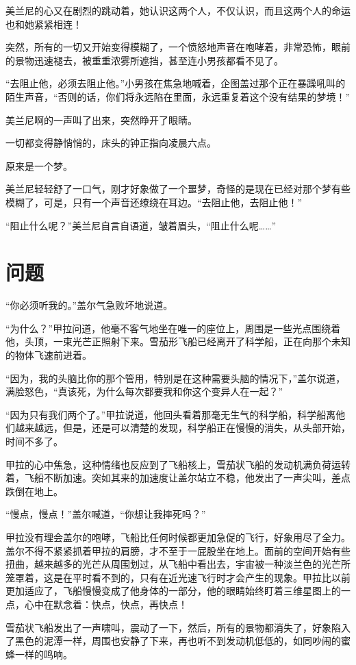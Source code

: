 美兰尼的心又在剧烈的跳动着，她认识这两个人，不仅认识，而且这两个人的命运也和她紧紧相连！ 

突然，所有的一切又开始变得模糊了，一个愤怒地声音在咆哮着，非常恐怖，眼前的景物迅速褪去，被重重浓雾所遮挡，甚至连小男孩都看不见了。 

“去阻止他，必须去阻止他。”小男孩在焦急地喊着，企图盖过那个正在暴躁吼叫的陌生声音，“否则的话，你们将永远陷在里面，永远重复着这个没有结果的梦境！” 

美兰尼啊的一声叫了出来，突然睁开了眼睛。 

一切都变得静悄悄的，床头的钟正指向凌晨六点。 

原来是一个梦。 

美兰尼轻轻舒了一口气，刚才好象做了一个噩梦，奇怪的是现在已经对那个梦有些模糊了，可是，只有一个声音还缭绕在耳边。“去阻止他，去阻止他！” 

“阻止什么呢？”美兰尼自言自语道，皱着眉头，“阻止什么呢……” 

\chapter{问题}

“你必须听我的。”盖尔气急败坏地说道。 

“为什么？”甲拉问道，他毫不客气地坐在唯一的座位上，周围是一些光点围绕着他，头顶，一束光芒正照射下来。雪茄形飞船已经离开了科学船，正在向那个未知的物体飞速前进着。 

“因为，我的头脑比你的那个管用，特别是在这种需要头脑的情况下，”盖尔说道，满脸怒色，“真该死，为什么每次都要我和你这个变异人在一起？” 

“因为只有我们两个了。”甲拉说道，他回头看着那毫无生气的科学船，科学船离他们越来越远，但是，还是可以清楚的发现，科学船正在慢慢的消失，从头部开始，时间不多了。 

甲拉的心中焦急，这种情绪也反应到了飞船核上，雪茄状飞船的发动机满负荷运转着，飞船不断加速。突如其来的加速度让盖尔站立不稳，他发出了一声尖叫，差点跌倒在地上。 

“慢点，慢点！”盖尔喊道，“你想让我摔死吗？” 

甲拉没有理会盖尔的咆哮，飞船比任何时候都更加急促的飞行，好象用尽了全力。盖尔不得不紧紧抓着甲拉的肩膀，才不至于一屁股坐在地上。面前的空间开始有些扭曲，越来越多的光芒从周围划过，从飞船中看出去，宇宙被一种淡兰色的光芒所笼罩着，这是在平时看不到的，只有在近光速飞行时才会产生的现象。甲拉比以前更加适应了，飞船慢慢变成了他身体的一部分，他的眼睛始终盯着三维星图上的一点，心中在默念着：快点，快点，再快点！ 

雪茄状飞船发出了一声啸叫，震动了一下，然后，所有的景物都消失了，好象陷入了黑色的泥潭一样，周围也安静了下来，再也听不到发动机低低的，如同吵闹的蜜蜂一样的鸣响。 

